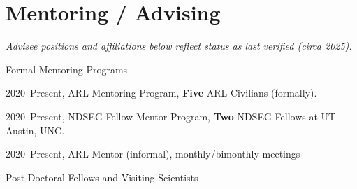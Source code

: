 \section{\sc Mentoring / Advising}

\textit{Advisee positions and affiliations below reflect status as last verified (circa 2025).}

Formal Mentoring Programs
\begin{list2}
\vspace*{.05in}
\item
2020--Present, ARL Mentoring Program, \textbf{Five} ARL Civilians (formally).

\item
2020--Present, NDSEG Fellow Mentor Program, \textbf{Two} NDSEG Fellows at UT-Austin, UNC.

\item
2020--Present, ARL Mentor (informal), monthly/bimonthly meetings

\end{list2}

Post-Doctoral Fellows and Visiting Scientists

